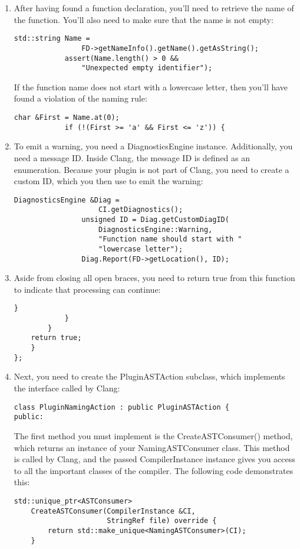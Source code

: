 \begin{enumerate}
\item After having found a function declaration, you'll need to retrieve the name of the function. You'll also need to make sure that the name is not empty:
\begin{lstlisting}[caption={}]
			std::string Name =
				FD->getNameInfo().getName().getAsString();
			assert(Name.length() > 0 &&
				"Unexpected empty identifier");
\end{lstlisting}
If the function name does not start with a lowercase letter, then you'll have found a violation of the naming rule:
\begin{lstlisting}[caption={}]
			char &First = Name.at(0);
			if (!(First >= 'a' && First <= 'z')) {
\end{lstlisting}

\item To emit a warning, you need a DiagnosticsEngine instance. Additionally, you need a message ID. Inside Clang, the message ID is defined as an enumeration. Because your plugin is not part of Clang, you need to create a custom ID, which you then use to emit the warning:
\begin{lstlisting}[caption={}]
				DiagnosticsEngine &Diag =
					CI.getDiagnostics();
				unsigned ID = Diag.getCustomDiagID(
					DiagnosticsEngine::Warning,
					"Function name should start with "
					"lowercase letter");
				Diag.Report(FD->getLocation(), ID);
\end{lstlisting}

\item Aside from closing all open braces, you need to return true from this function to indicate that processing can continue:
\begin{lstlisting}[caption={}]
				}
			}
		}
	return true;
	}
};
\end{lstlisting}

\item Next, you need to create the PluginASTAction subclass, which implements the interface called by Clang:
\begin{lstlisting}[caption={}]
class PluginNamingAction : public PluginASTAction {
public:
\end{lstlisting}
The first method you must implement is the CreateASTConsumer() method, which returns an instance of your NamingASTConsumer class. This method is called by Clang, and the passed CompilerInstance instance gives you access to all the important classes of the compiler. The following code demonstrates this:
\begin{lstlisting}[caption={}]
	std::unique_ptr<ASTConsumer>
	CreateASTConsumer(CompilerInstance &CI,
					  StringRef file) override {
		return std::make_unique<NamingASTConsumer>(CI);
	}
\end{lstlisting}


\end{enumerate}
